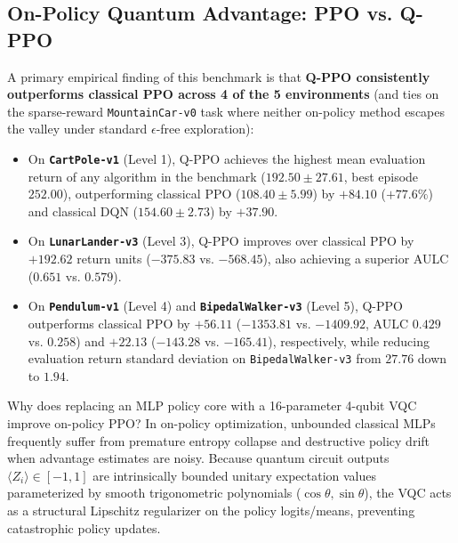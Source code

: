 \documentclass[conference]{IEEEtran}
\begin{document}
\subsection{On-Policy Quantum Advantage: PPO vs. Q-PPO}
A primary empirical finding of this benchmark is that \textbf{Q-PPO consistently outperforms classical PPO across 4 of the 5 environments} (and ties on the sparse-reward \texttt{MountainCar-v0} task where neither on-policy method escapes the valley under standard $\epsilon$-free exploration):
\begin{itemize}
    \item On \textbf{\texttt{CartPole-v1}} (Level 1), Q-PPO achieves the highest mean evaluation return of any algorithm in the benchmark ($192.50 \pm 27.61$, best episode $252.00$), outperforming classical PPO ($108.40 \pm 5.99$) by $+84.10$ ($+77.6\%$) and classical DQN ($154.60 \pm 2.73$) by $+37.90$.
    \item On \textbf{\texttt{LunarLander-v3}} (Level 3), Q-PPO improves over classical PPO by $+192.62$ return units ($-375.83$ vs. $-568.45$), also achieving a superior AULC ($0.651$ vs. $0.579$).
    \item On \textbf{\texttt{Pendulum-v1}} (Level 4) and \textbf{\texttt{BipedalWalker-v3}} (Level 5), Q-PPO outperforms classical PPO by $+56.11$ ($-1353.81$ vs. $-1409.92$, AULC $0.429$ vs. $0.258$) and $+22.13$ ($-143.28$ vs. $-165.41$), respectively, while reducing evaluation return standard deviation on \texttt{BipedalWalker-v3} from $27.76$ down to $1.94$.
\end{itemize}
Why does replacing an MLP policy core with a 16-parameter 4-qubit VQC improve on-policy PPO? In on-policy optimization, unbounded classical MLPs frequently suffer from premature entropy collapse and destructive policy drift when advantage estimates are noisy. Because quantum circuit outputs $\langle Z_i \rangle \in [-1, 1]$ are intrinsically bounded unitary expectation values parameterized by smooth trigonometric polynomials ($\cos\theta, \sin\theta$), the VQC acts as a structural Lipschitz regularizer on the policy logits/means, preventing catastrophic policy updates.
\end{document}
